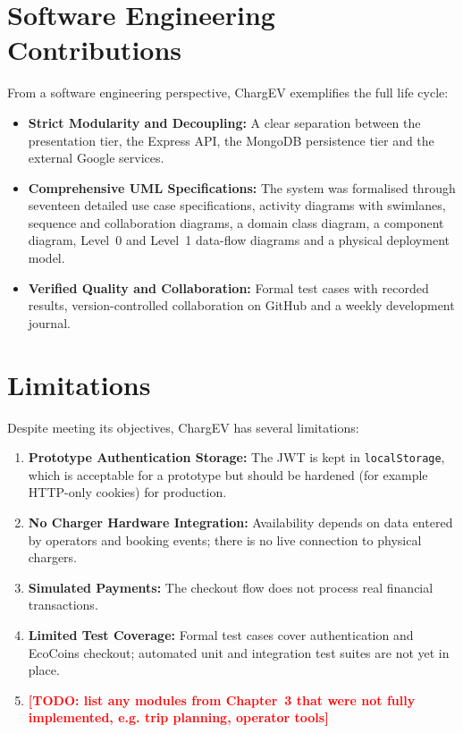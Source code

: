 \documentclass{tietreport}
\newcommand{\todo}[1]{\textcolor{red}{\textbf{[TODO: #1]}}}
\begin{document}
\section{Software Engineering Contributions}

From a software engineering perspective, ChargEV exemplifies
the full life cycle:

\begin{itemize}
  \item \textbf{Strict Modularity and Decoupling:} A clear
    separation between the presentation tier, the Express
    API, the MongoDB persistence tier and the external
    Google services.
  \item \textbf{Comprehensive UML Specifications:} The
    system was formalised through seventeen detailed use
    case specifications, activity diagrams with swimlanes,
    sequence and collaboration diagrams, a domain class
    diagram, a component diagram, Level~0 and Level~1
    data-flow diagrams and a physical deployment model.
  \item \textbf{Verified Quality and Collaboration:} Formal
    test cases with recorded results, version-controlled
    collaboration on GitHub and a weekly development
    journal.
\end{itemize}

\section{Limitations}

Despite meeting its objectives, ChargEV has several
limitations:

\begin{enumerate}
  \item \textbf{Prototype Authentication Storage:} The JWT
    is kept in \texttt{localStorage}, which is acceptable
    for a prototype but should be hardened (for example
    HTTP-only cookies) for production.
  \item \textbf{No Charger Hardware Integration:}
    Availability depends on data entered by operators and
    booking events; there is no live connection to
    physical chargers.
  \item \textbf{Simulated Payments:} The checkout flow
    does not process real financial transactions.
  \item \textbf{Limited Test Coverage:} Formal test cases
    cover authentication and EcoCoins checkout; automated
    unit and integration test suites are not yet in
    place.
  \item \todo{list any modules from Chapter~3 that were not fully implemented, e.g. trip planning, operator tools}
\end{enumerate}
\end{document}
